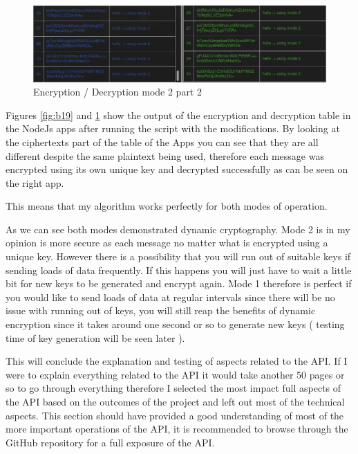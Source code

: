 \begin{figure}[!h]
  \centering
      \includegraphics[width=1\textwidth]{Figures/b20.png}
  \caption[Encryption / Decryption mode 2 part 2]{Encryption / Decryption mode 2 part 2}
  \label{fig:b20}
\end{figure}
\FloatBarrier
Figures \ref{fig:b19} and \ref{fig:b20} show the output of the encryption and decryption table in the NodeJs apps after running the script with the modifications.
By looking at the ciphertexts part of the table of the Apps you can see that they are all different despite the same plaintext being used, therefore each message was encrypted using its own unique key and decrypted successfully as can be seen on the right app. 

This means that my algorithm works perfectly for both modes of operation.

As we can see both modes demonstrated dynamic cryptography. Mode 2 is in my opinion is more secure as each message no matter what is encrypted using a unique key. However there is a possibility that you will run out of suitable keys if sending loads of data frequently. If this happens you will just have to wait a little bit for new keys to be generated and encrypt again. 
Mode 1 therefore is perfect if you would like to send loads of data at regular intervals since there will be no issue with running out of keys, you will still reap the benefits of dynamic encryption since it takes around one second or so to generate new keys ( testing time of key generation will be seen later ). 

This will conclude the explanation and testing of aspects related to the API. If I were to explain everything related to the API it would take another 50 pages or so to go through everything therefore I selected the most impact full aspects of the API based on the outcomes of the project and left out most of the technical aspects. This section should have provided a good understanding of most of the more important operations of the API, it is recommended to browse through the GitHub repository for a full exposure of the API.

